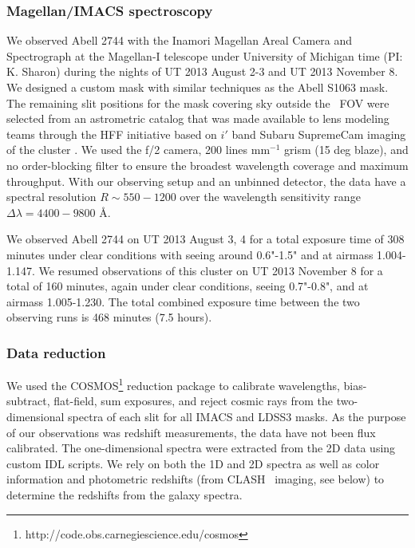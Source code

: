 \subsubsection{Magellan/IMACS spectroscopy}
We observed Abell 2744 with the Inamori Magellan Areal Camera and Spectrograph \citep[IMACS; ][]{Dressler:2011dq} at the Magellan-I telescope under University of Michigan time (PI: K. Sharon) during the nights of UT 2013 August 2-3 and UT 2013 November 8. We designed a custom mask with similar techniques as the Abell S1063 mask. The remaining slit positions for the mask covering sky outside the \hst\ FOV were selected from an astrometric catalog that was made available to lens modeling teams through the HFF initiative based on $i'$ band Subaru SupremeCam imaging of the cluster \citep{Merten:2011fk}. We used the f/2 camera, 200 lines $\mathrm{mm^{-1}}$ grism (15 deg blaze), and no order-blocking filter to ensure the broadest wavelength coverage and maximum throughput. With our observing setup and an unbinned detector, the data have a spectral resolution $R\sim550-1200$ over the wavelength sensitivity range $\Delta\lambda=4400-9800$ \AA.

We observed Abell 2744 on UT 2013 August 3, 4 for a total exposure time of 308 minutes under clear conditions with seeing around 0.6"-1.5" and at airmass 1.004-1.147. We resumed observations of this cluster on UT 2013 November 8 for a total of 160 minutes, again under clear conditions, seeing 0.7"-0.8", and at airmass 1.005-1.230. The total combined exposure time between the two observing runs is 468 minutes (7.5 hours).

\subsubsection{Data reduction}
We used the COSMOS\footnote{http://code.obs.carnegiescience.edu/cosmos} reduction package to calibrate wavelengths, bias-subtract, flat-field, sum exposures, and reject cosmic rays from the two-dimensional spectra of each slit for all IMACS and LDSS3 masks. As the purpose of our observations was redshift measurements, the data have not been flux calibrated. The one-dimensional spectra were extracted from the 2D data using custom IDL scripts. We rely on both the 1D and 2D spectra as well as color information and photometric redshifts (from CLASH \hst\ imaging, see below) to determine the redshifts from the galaxy spectra.

